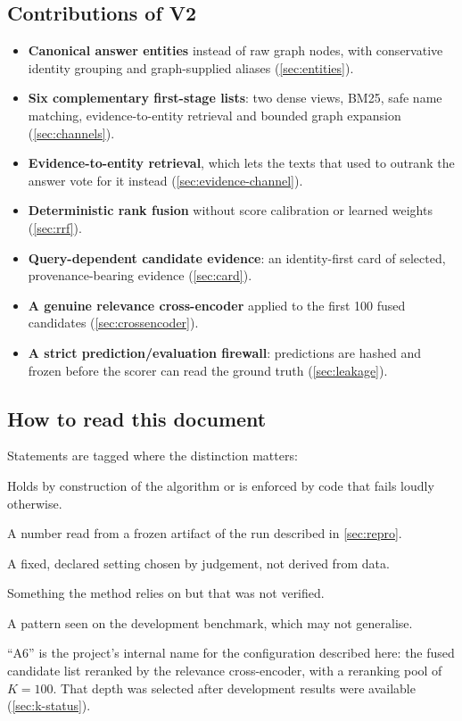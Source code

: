 \documentclass[11pt,a4paper]{article}
\newcommand{\cref}[1]{\autoref{#1}}
\theoremstyle{remark}
\newcommand{\vtag}[2]{{\sffamily\scriptsize\bfseries\textcolor{#1}{[#2]}}}
\newcommand{\Gtag}{\vtag{accent}{GUARANTEED}}
\newcommand{\Mtag}{\vtag{measgreen}{MEASURED}}
\newcommand{\Dtag}{\vtag{black!60}{DESIGN CHOICE}}
\newcommand{\Atag}{\vtag{warnline}{ASSUMED}}
\newcommand{\Otag}{\vtag{warnline}{DEVELOPMENT OBSERVATION}}
\begin{document}
\subsection{Contributions of V2}

\begin{itemize}
  \item \textbf{Canonical answer entities} instead of raw graph nodes, with conservative
        identity grouping and graph-supplied aliases (\cref{sec:entities}).
  \item \textbf{Six complementary first-stage lists}: two dense views, BM25, safe name
        matching, evidence-to-entity retrieval and bounded graph expansion
        (\cref{sec:channels}).
  \item \textbf{Evidence-to-entity retrieval}, which lets the texts that used to outrank
        the answer vote for it instead (\cref{sec:evidence-channel}).
  \item \textbf{Deterministic rank fusion} without score calibration or learned weights
        (\cref{sec:rrf}).
  \item \textbf{Query-dependent candidate evidence}: an identity-first card of selected,
        provenance-bearing evidence (\cref{sec:card}).
  \item \textbf{A genuine relevance cross-encoder} applied to the first 100 fused
        candidates (\cref{sec:crossencoder}).
  \item \textbf{A strict prediction/evaluation firewall}: predictions are hashed and
        frozen before the scorer can read the ground truth (\cref{sec:leakage}).
\end{itemize}

\subsection{How to read this document}

Statements are tagged where the distinction matters:
\begin{description}[leftmargin=0.6cm,style=nextline,itemsep=1pt]
  \item[\Gtag] Holds by construction of the algorithm or is enforced by code that fails
        loudly otherwise.
  \item[\Mtag] A number read from a frozen artifact of the run described in
        \cref{sec:repro}.
  \item[\Dtag] A fixed, declared setting chosen by judgement, not derived from data.
  \item[\Atag] Something the method relies on but that was not verified.
  \item[\Otag] A pattern seen on the development benchmark, which may not generalise.
\end{description}
``A6'' is the project's internal name for the configuration described here: the fused
candidate list reranked by the relevance cross-encoder, with a reranking pool of
$K=100$. That depth was selected after development results were available
(\cref{sec:k-status}).
\end{document}
